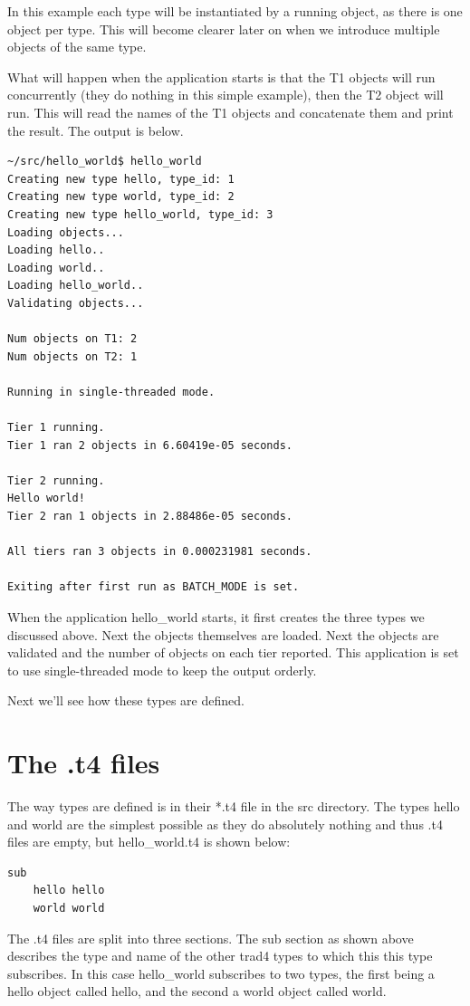 \documentclass{report}
\begin{document}
In this example each type will be instantiated by a running object, as there is one object per type. This will become clearer later on when we introduce multiple objects of the same type.

What will happen when the application starts is that the T1 objects will run concurrently (they do nothing in this simple example), then the T2 object will run. This will read the names of the T1 objects and concatenate them and print the result. The output is below.

\begin{verbatim}
~/src/hello_world$ hello_world
Creating new type hello, type_id: 1
Creating new type world, type_id: 2
Creating new type hello_world, type_id: 3
Loading objects...
Loading hello..
Loading world..
Loading hello_world..
Validating objects...

Num objects on T1: 2
Num objects on T2: 1

Running in single-threaded mode.

Tier 1 running.
Tier 1 ran 2 objects in 6.60419e-05 seconds.

Tier 2 running.
Hello world!
Tier 2 ran 1 objects in 2.88486e-05 seconds.

All tiers ran 3 objects in 0.000231981 seconds.

Exiting after first run as BATCH_MODE is set.
\end{verbatim}

When the application hello_world starts, it first creates the three types we discussed above. Next the objects themselves are loaded. Next the objects are validated and the number of objects on each tier reported. This application is set to use single-threaded mode to keep the output orderly. 

Next we'll see how these types are defined.

\section{The .t4 files}

The way types are defined is in their *.t4 file in the src directory. The types hello and world are the simplest possible as they do absolutely nothing and thus .t4 files are empty, but hello_world.t4 is shown below:

\begin{verbatim}
sub
    hello hello
    world world
\end{verbatim}

The .t4 files are split into three sections. The sub section as shown above describes the type and name of the other trad4 types to which this this type subscribes. In this case hello_world subscribes to two types, the first being a hello object called hello, and the second a world object called world.
\end{document}
